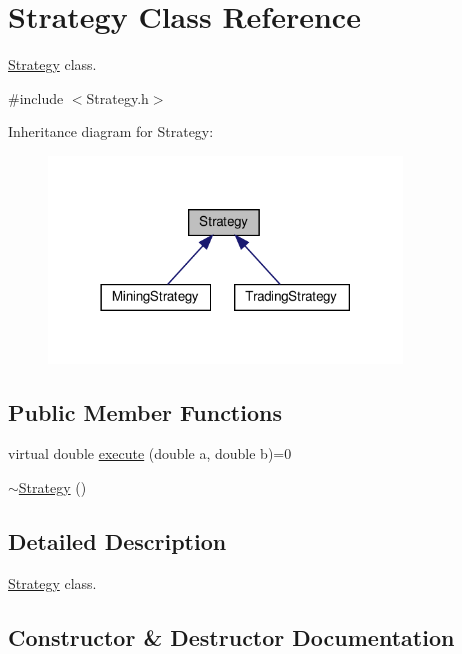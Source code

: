 \hypertarget{classStrategy}{}\section{Strategy Class Reference}
\label{classStrategy}


\hyperlink{classStrategy}{Strategy} class.  




{\ttfamily \#include $<$Strategy.\+h$>$}



Inheritance diagram for Strategy\+:
\nopagebreak
\begin{figure}[H]
\begin{center}
\leavevmode
\includegraphics[width=266pt]{classStrategy__inherit__graph}
\end{center}
\end{figure}
\subsection*{Public Member Functions}
\begin{DoxyCompactItemize}
\item 
virtual double \hyperlink{classStrategy_a81b8d4f53494c438b21fc999c7ea59f4}{execute} (double a, double b)=0
\item 
\hyperlink{classStrategy_a37c0bbdd64fd7dfcdd91578784a64775}{$\sim$\+Strategy} ()
\end{DoxyCompactItemize}


\subsection{Detailed Description}
\hyperlink{classStrategy}{Strategy} class. 

\subsection{Constructor \& Destructor Documentation}
\mbox{\label{classStrategy_a37c0bbdd64fd7dfcdd91578784a64775}} 
